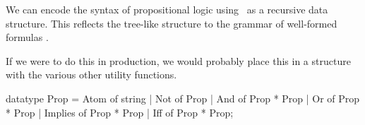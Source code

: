 \begin{node}\label{prop-000G}%
We can encode the syntax of propositional logic using \SML\ as a
recursive data structure. This reflects the tree-like structure to the
grammar of well-formed formulas .

If we were to do this in production, we would probably place this in a
structure with the various other utility functions.

\begin{sml}
datatype Prop = Atom of string
              | Not of Prop
              | And of Prop * Prop
              | Or of Prop * Prop
              | Implies of Prop * Prop
              | Iff of Prop * Prop;
\end{sml}
\end{node}
